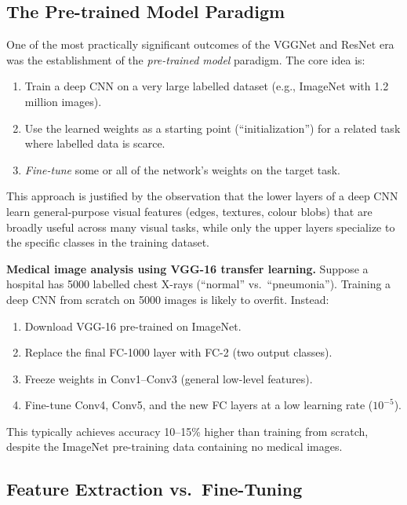 \documentclass[12pt,a4paper]{article}
\begin{document}
\subsection{The Pre-trained Model Paradigm}

One of the most practically significant outcomes of the VGGNet and ResNet era was the establishment of the \emph{pre-trained model} paradigm. The core idea is:

\begin{enumerate}[leftmargin=2em]
  \item Train a deep CNN on a very large labelled dataset (e.g., ImageNet with 1.2 million images).
  \item Use the learned weights as a starting point (``initialization'') for a related task where labelled data is scarce.
  \item \emph{Fine-tune} some or all of the network's weights on the target task.
\end{enumerate}

This approach is justified by the observation that the lower layers of a deep CNN learn general-purpose visual features (edges, textures, colour blobs) that are broadly useful across many visual tasks, while only the upper layers specialize to the specific classes in the training dataset.

\begin{example}
\textbf{Medical image analysis using VGG-16 transfer learning.} Suppose a hospital has 5000 labelled chest X-rays (``normal'' vs.\ ``pneumonia''). Training a deep CNN from scratch on 5000 images is likely to overfit. Instead:
\begin{enumerate}[leftmargin=2em]
  \item Download VGG-16 pre-trained on ImageNet.
  \item Replace the final FC-1000 layer with FC-2 (two output classes).
  \item Freeze weights in Conv1--Conv3 (general low-level features).
  \item Fine-tune Conv4, Conv5, and the new FC layers at a low learning rate ($10^{-5}$).
\end{enumerate}
This typically achieves accuracy 10--15\% higher than training from scratch, despite the ImageNet pre-training data containing no medical images.
\end{example}

\subsection{Feature Extraction vs.\ Fine-Tuning}
\end{document}
